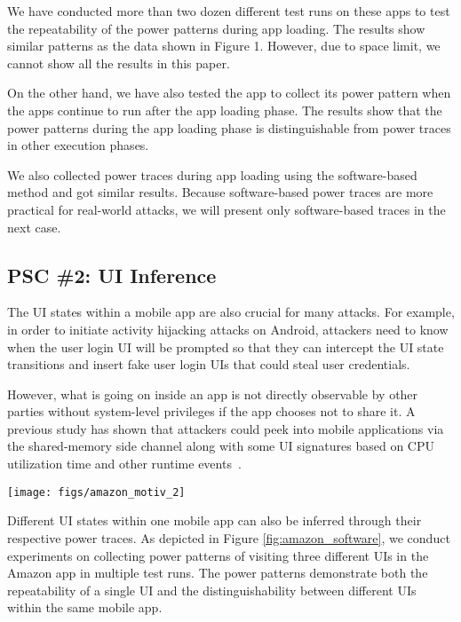 \documentclass{sig-alternate}
\begin{document}
We have conducted more than two dozen different test runs on these apps to test the repeatability of the power patterns during app loading. The results show similar patterns as the data shown in Figure 1. However, due to space limit, we cannot show all the results in this paper.

On the other hand, we have also tested the app to collect its power pattern when the apps continue to run after the app loading phase. The results show that the power patterns during the app loading phase is distinguishable from power traces in other execution phases.

We also collected power traces during app loading using the software-based method and got similar results.
Because software-based power traces are more practical for real-world attacks, we will present only software-based traces in the next case.

\subsection{PSC \#2: UI Inference}
\label{sec:uiin}

The UI states within a mobile app are also crucial for many attacks. For example, in order to initiate activity hijacking attacks on Android, attackers need to know when the user login UI will be prompted so that they can intercept the UI state transitions and insert fake user login UIs that could steal user credentials.

However, what is going on inside an app is not directly observable by other parties without system-level privileges if the app chooses not to share it. A previous study has shown that attackers could peek into mobile applications via the shared-memory side channel along with some UI signatures based on CPU utilization time and other runtime events~\cite{chen:2014}.

\begin{figure*}[!t]
\centering
\texttt{[image: figs/amazon\_motiv\_2]}
\caption{Power traces collected through software-based measurement for the Amazon app. The three UIs shown above are \emph{app entry, product details, and user login}, respectively.}
\label{fig:amazon_software}
\end{figure*}

Different UI states within one mobile app can also be inferred through their respective power traces. As depicted in Figure \ref{fig:amazon_software}, we conduct experiments on collecting power patterns of visiting three different UIs in the Amazon app in multiple test runs. The power patterns demonstrate both the repeatability of a single UI and the distinguishability between different UIs within the same mobile app.
\end{document}

